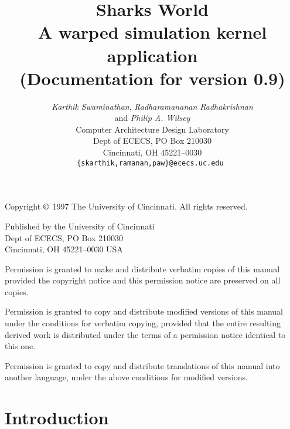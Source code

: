 
\newcommand{\version}{0.9}



\title{
Sharks World\\
A {\sc warped} simulation kernel application\\
(Documentation for version \version)}

\author{
\emph{Karthik Swaminathan}, \emph{Radharamananan Radhakrishnan}\\
and \emph{Philip A. Wilsey}\\
Computer Architecture Design Laboratory \\
Dept of ECECS, PO Box 210030 \\
Cincinnati, OH  45221--0030 \\
\tt{\{skarthik,ramanan,paw\}@ececs.uc.edu}
}
 
\date{}


\maketitle

\vspace*{4in}

\noindent
Copyright $\copyright$ 1997 The University of Cincinnati.  All
rights reserved.

\bigskip

\noindent
Published by the University of Cincinnati \\
Dept of ECECS, PO Box 210030 \\
Cincinnati, OH  45221--0030 USA

\bigskip

\noindent
Permission is granted to make and distribute verbatim copies of
this manual provided the copyright notice and this permission notice
are preserved on all copies.

\medskip
\noindent
Permission is granted to copy and distribute modified versions of this
manual under the conditions for verbatim copying, provided that the entire
resulting derived work is distributed under the terms of a permission
notice identical to this one.

\medskip
\noindent
Permission is granted to copy and distribute translations of this manual
into another language, under the above conditions for modified versions.

\newpage

\section*{Introduction}

